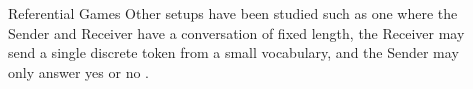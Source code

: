 \documentclass[final]{beamer}
\newlength{\sepwid}
\newlength{\onecolwid}
\begin{document}
\begin{frame}[t]
\begin{columns}[t]
\begin{column}{\onecolwid}
\begin{block}{Referential Games}
Other setups have been studied such as one where the Sender and Receiver have a conversation of fixed length, the Receiver may send a single discrete token from a small vocabulary, and the Sender may only answer yes or no \cite{Jorge:2016learning}.

\end{block}

\vspace{5mm}




  
  




\end{column} %

\begin{column}{\sepwid}\end{column} %

\begin{column}{\onecolwid}



\end{column}
\end{columns}
\end{frame}
\end{document}
